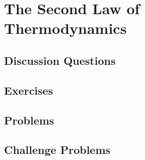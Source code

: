
\chapter{The Second Law of Thermodynamics}

\section{Discussion Questions}

\section{Exercises}

\section{Problems}

\section{Challenge Problems}
